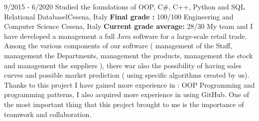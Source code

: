 \documentclass[
    10pt,
    A4,
    english,
    draft = false,
    twoside = false,
]{article}
\begin{document}

	 {9/2015 - 6/2020}
	{Studied the foundations of OOP, C#, C++, Python and SQL Relational Databasel}{Cesena, Italy}
	{\textbf{Final grade :} 100/100}
	{Engineering and Computer Science }{Cesena, Italy}
	{\textbf{Current grade average:}  28/30}
	{My team and I have developed a management a full Java software for a large-scale retail trade. Among the various components of our software ( management of the Staff, management the Departments, management the products, management the stock and management the suppliers ), there war also the possibility of having sales curves and possible market prediction ( using specific algorithms created by us). Thanks to this project I have gained more experience in : OOP Programming and programming patterns, I also acquired more experience in using GitHub. One of the most important thing that this project brought to me is the importance of teamwork and collaboration.} 
\end{document}
